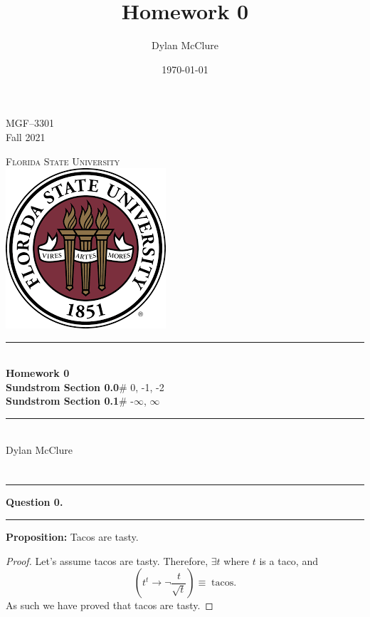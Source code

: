 \documentclass[letter]{article}
\title{Homework 0}
\author{Dylan McClure}
\date{\today}
\theoremstyle{definition}
\newcommand*\question[1]{%
  \noindent\rule{\textwidth}{0.4pt}
  \Large
  \textbf{Question #1.} \\\vspace{-9pt}%
  \noindent\rule{\textwidth}{0.4pt}\vspace{-20pt}
}
\begin{document}
\begin{titlepage} %
  \Large
  \begin{flushright}
    MGF--3301 \\
    Fall 2021 \\
  \end{flushright}
  \begin{center}
    \vspace{0.4in} \textsc{\Huge Florida State University} \\
    \vspace{0.4in} \includegraphics[scale=0.75]{fsu_logo.png} \\
    \vspace{0.4in} \rule[0.2cm]{13cm}{0.1cm} \\ \vspace{0.4cm}
    {\Huge \bfseries Homework 0} \\[0.4cm]
    {\LARGE \bfseries Sundstrom Section 0.0}{\Large \quad \# 0, -1, -2} \\
    {\LARGE \bfseries Sundstrom Section 0.1}{\Large \quad \# -$\infty$, $\infty$ } \\
    \vspace{0.4in} \rule[0.2cm]{13cm}{0.1cm} \\
    \vspace*{\fill}
    Dylan McClure 
  \end{center}
\end{titlepage} %

\section*{}

\question{0}

\textbf{Proposition:} Tacos are tasty.

\begin{proof}
  Let's assume tacos are tasty. Therefore, $\exists t$ where $t$ is a taco, and
  $$
  \left( t^t \rightarrow \neg\frac{t}{\sqrt{t}} \right) \equiv \;\mathrm{tacos}.
  $$
  As such we have proved that tacos are tasty.
\end{proof}
\end{document}
